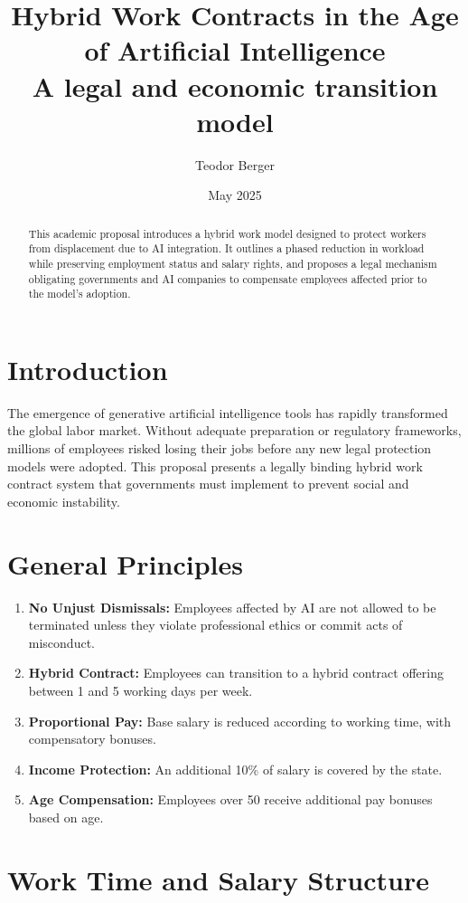 \documentclass[12pt]{article}
\title{
    \textbf{Hybrid Work Contracts in the Age of Artificial Intelligence}\\[1ex]
    \large \normalfont A legal and economic transition model
}
\author{Teodor Berger}
\date{May 2025}
\begin{document}
\maketitle

\begin{abstract}
This academic proposal introduces a hybrid work model designed to protect workers from displacement due to AI integration. It outlines a phased reduction in workload while preserving employment status and salary rights, and proposes a legal mechanism obligating governments and AI companies to compensate employees affected prior to the model's adoption.
\end{abstract}

\section{Introduction}
The emergence of generative artificial intelligence tools has rapidly transformed the global labor market. Without adequate preparation or regulatory frameworks, millions of employees risked losing their jobs before any new legal protection models were adopted. This proposal presents a legally binding hybrid work contract system that governments must implement to prevent social and economic instability.

\section{General Principles}
\begin{enumerate}
    \item \textbf{No Unjust Dismissals:} Employees affected by AI are not allowed to be terminated unless they violate professional ethics or commit acts of misconduct.
    \item \textbf{Hybrid Contract:} Employees can transition to a hybrid contract offering between 1 and 5 working days per week.
    \item \textbf{Proportional Pay:} Base salary is reduced according to working time, with compensatory bonuses.
    \item \textbf{Income Protection:} An additional 10\% of salary is covered by the state.
    \item \textbf{Age Compensation:} Employees over 50 receive additional pay bonuses based on age.
\end{enumerate}

\section{Work Time and Salary Structure}
\end{document}

